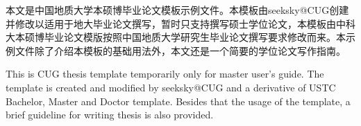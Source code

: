 \begin{cnabstract}
\begin{spacing}{1.0}
本文是中国地质大学本硕博毕业论文模板示例文件。本模板由seeksky@CUG创建并修改以适用于地大毕业论文撰写，暂时只支持撰写硕士学位论文，本模板由中科大本硕博毕业论文模版按照中国地质大学研究生毕业论文撰写要求修改而来。本示例文件除了介绍本模板的基础用法外，本文还是一个简要的学位论文写作指南。

\end{spacing}
\end{cnabstract}


\begin{enabstract}
\begin{spacing}{1.0}
This is CUG thesis template temporarily only for master user's guide. The template is created and modified by seeksky@CUG and a derivative of USTC Bachelor, Master and Doctor template. Besides that
the usage of the template, a brief
guideline for writing thesis is also provided.


\end{spacing}
\end{enabstract}
